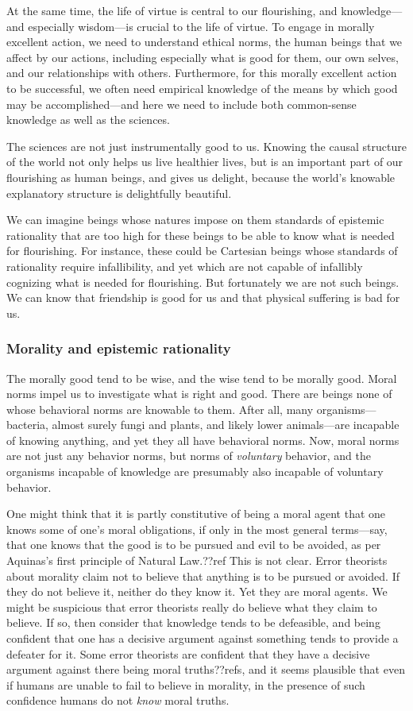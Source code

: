 At the same time, the life of virtue is central to our flourishing, and knowledge---and especially wisdom---is 
crucial to the life of virtue. To engage in morally excellent action, we need to understand ethical norms, the 
human beings that we affect by our actions, including especially what is good for them, our own selves, and our 
relationships with others. Furthermore, for this morally excellent action to be successful, we often need empirical
knowledge of the means by which good may be accomplished---and here we need to include both common-sense knowledge 
as well as the sciences.

The sciences are not just instrumentally good to us. Knowing the causal structure of the world not only helps us 
live healthier lives, but is an important part of our flourishing as human beings, and gives us delight, because
the world's knowable explanatory structure is delightfully beautiful.

We can imagine beings whose natures impose on them standards of epistemic rationality that are too high for these beings to 
be able to know what is needed for flourishing. For instance, these could be Cartesian beings whose standards of rationality 
require infallibility, and yet which are not capable of infallibly cognizing what is needed for flourishing. But fortunately 
we are not such beings. We can know that friendship is good for us and that physical suffering is bad for us. 

\subsubsection{Morality and epistemic rationality}
The morally good tend to be wise, and the wise tend to be morally good. Moral norms impel us to investigate what is 
right and good. There are beings none of whose behavioral norms are knowable to them. After all, many organisms---bacteria, almost surely fungi and plants, and likely lower animals---are incapable of knowing anything, and yet they all have behavioral norms.
Now, moral norms are not just any behavior norms, but norms of \textit{voluntary} behavior, and the organisms incapable
of knowledge are presumably also incapable of voluntary behavior. 

One might think that it is partly constitutive of being a moral agent that one knows some of one's moral obligations, if 
only in the most general terms---say, that one knows that the good is to be pursued and evil to be avoided, as per 
Aquinas's first principle of Natural Law.??ref This is not clear. Error theorists about morality claim not to believe
that anything is to be pursued or avoided. If they do not believe it, neither do they know it. Yet they are moral agents.
We might be suspicious that error theorists really do believe what they claim to believe. If so, then consider that knowledge
tends to be defeasible, and being confident that one has a decisive argument against something tends to provide a defeater 
for it. Some error theorists are confident that they have a decisive argument against there being moral truths??refs, and it 
seems plausible that even if humans are unable to fail to believe in morality, in the presence of such confidence humans do 
not \textit{know} moral truths. 

